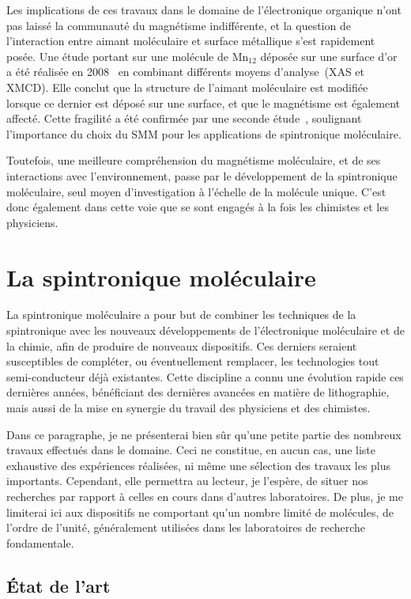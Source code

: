Les implications de ces travaux dans le domaine de l'électronique organique n'ont pas laissé la communauté du magnétisme indifférente, et la question de l'interaction entre aimant moléculaire et surface métallique s'est rapidement posée. Une étude portant sur une molécule de Mn$_{12}$ déposée sur une surface d'or a été réalisée en 2008~\cite{Mannini2008} en combinant différents moyens d'analyse~(XAS et XMCD). Elle conclut que la structure de l'aimant moléculaire est modifiée lorsque ce dernier est déposé sur une surface, et que le magnétisme est également affecté. Cette fragilité a été confirmée par une seconde étude~\cite{Mannini2009}, soulignant l'importance du choix du SMM pour les applications de spintronique moléculaire.

Toutefois, une meilleure compréhension du magnétisme moléculaire, et de ses interactions avec l’environnement, passe par le développement de la spintronique moléculaire, seul moyen d'investigation à l'échelle de la molécule unique. C'est donc également dans cette voie que se sont engagés à la fois les chimistes et les physiciens.


\section{La spintronique moléculaire}
La spintronique moléculaire a pour but de combiner les techniques de la spintronique avec les nouveaux développements de l'électronique moléculaire et de la chimie, afin de produire de nouveaux dispositifs. Ces derniers seraient susceptibles de compléter, ou éventuellement remplacer, les technologies tout semi-conducteur déjà existantes. Cette discipline a connu une évolution rapide ces dernières années, bénéficiant des dernières avancées en matière de lithographie, mais aussi de la mise en synergie du travail des physiciens et des chimistes. 

Dans ce paragraphe, je ne présenterai bien sûr qu'une petite partie des nombreux travaux effectués dans le domaine. Ceci ne constitue, en aucun cas, une liste exhaustive des expériences réalisées, ni m\^eme une sélection des travaux les plus importants. Cependant, elle permettra au lecteur, je l'espère, de situer nos recherches par rapport à celles en cours dans d'autres laboratoires. De plus, je me limiterai ici aux dispositifs ne comportant qu'un nombre limité de molécules, de l'ordre de l'unité, généralement utilisées dans les laboratoires de recherche fondamentale.
\subsection{État de l'art}

